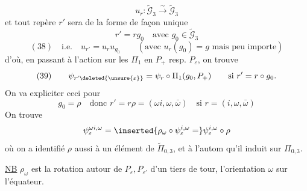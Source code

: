 \[
u_r:\widetilde{\mathcal G}_3\xrightarrow{\sim}\widetilde{\mathcal G}_3
\]
et tout repère $r'$  sera de la forme de façon unique
\[
r'=rg_0\quad\text{avec }g_0\in\widetilde{\mathcal G}_3
\]
\[
(38)\quad\text{i.e.}\quad u_{r'}=u_ru_{g_0}\qquad(\text{avec }u_r(g_0)=g\text{ mais peu importe})
\]
d'où, en passant à l'action sur les $\Pi_1$ en $P_+$ resp. $P_\varepsilon$, on trouve
\[
(39)\qquad \psi_{r'\deleted{\unsure{\varepsilon}}}=\psi_r\circ\Pi_1(g_0,P_+)\qquad\text{si }r'=r\circ g_0.
\]
On va expliciter ceci pour
\[
g_0=\rho\quad\text{donc }r'=r\rho=(\omega i,\omega,\bar\omega)\quad\text{si }r=(i,\omega,\bar\omega)
\]
On trouve
\[
\psi_\varepsilon^{\omega i,\omega}=\inserted{\rho_\omega\circ\psi_\varepsilon^{i,\omega}=}\psi_\varepsilon^{i,\omega}\circ\rho
\]
où on a identifié $\rho$ aussi à un élément de $\widetilde\Pi_{0,3}$, et à l'autom qu'il induit sur $\Pi_{0,3}$.

\uline{NB} $\rho_\omega$ est la rotation autour de $P_\varepsilon,P_{\varepsilon'}$ d'un tiers de tour,  l'orientation $\omega$ sur l'équateur.

